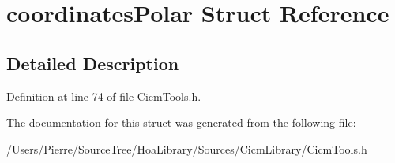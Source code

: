 \hypertarget{structcoordinates_polar}{\section{coordinates\-Polar Struct Reference}
\label{structcoordinates_polar}
}


\subsection{Detailed Description}


Definition at line 74 of file Cicm\-Tools.\-h.



The documentation for this struct was generated from the following file\-:\begin{DoxyCompactItemize}
\item 
/\-Users/\-Pierre/\-Source\-Tree/\-Hoa\-Library/\-Sources/\-Cicm\-Library/Cicm\-Tools.\-h\end{DoxyCompactItemize}
